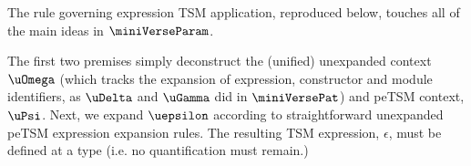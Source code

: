 \documentclass[acmlarge,review,anonymous]{acmart}\settopmatter{printfolios=true}
\begin{document}
The rule governing expression TSM application, reproduced below, touches all of the main ideas in $\miniVerseParam$. %
\begin{mathpar}
\end{mathpar}
The first two premises simply deconstruct the (unified) unexpanded context $\uOmega$ (which tracks the expansion of expression, constructor and module identifiers, as $\uDelta$ and $\uGamma$ did in $\miniVersePat$) and peTSM context, $\uPsi$. Next, we expand $\uepsilon$ according to straightforward unexpanded peTSM expression expansion rules. The resulting TSM expression, $\epsilon$, must be defined at a type (i.e. no quantification must remain.)
\end{document}

